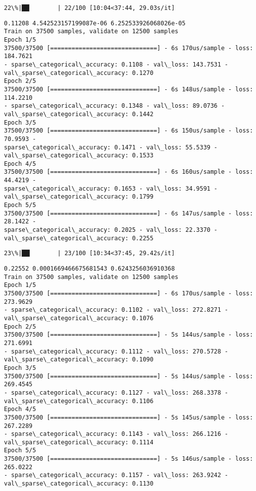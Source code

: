 \documentclass[11pt]{article}
\begin{document}
    \begin{Verbatim}[commandchars=\\\{\}]
 22\%|██▏       | 22/100 [10:04<37:44, 29.03s/it]
    \end{Verbatim}

    \begin{Verbatim}[commandchars=\\\{\}]
0.11208 4.542523157199087e-06 6.252533926068026e-05
Train on 37500 samples, validate on 12500 samples
Epoch 1/5
37500/37500 [==============================] - 6s 170us/sample - loss: 184.7621
- sparse\_categorical\_accuracy: 0.1108 - val\_loss: 143.7531 -
val\_sparse\_categorical\_accuracy: 0.1270
Epoch 2/5
37500/37500 [==============================] - 6s 148us/sample - loss: 114.2210
- sparse\_categorical\_accuracy: 0.1348 - val\_loss: 89.0736 -
val\_sparse\_categorical\_accuracy: 0.1442
Epoch 3/5
37500/37500 [==============================] - 6s 150us/sample - loss: 70.9593 -
sparse\_categorical\_accuracy: 0.1471 - val\_loss: 55.5339 -
val\_sparse\_categorical\_accuracy: 0.1533
Epoch 4/5
37500/37500 [==============================] - 6s 160us/sample - loss: 44.4219 -
sparse\_categorical\_accuracy: 0.1653 - val\_loss: 34.9591 -
val\_sparse\_categorical\_accuracy: 0.1799
Epoch 5/5
37500/37500 [==============================] - 6s 147us/sample - loss: 28.1422 -
sparse\_categorical\_accuracy: 0.2025 - val\_loss: 22.3370 -
val\_sparse\_categorical\_accuracy: 0.2255
    \end{Verbatim}

    \begin{Verbatim}[commandchars=\\\{\}]
 23\%|██▎       | 23/100 [10:34<37:45, 29.42s/it]
    \end{Verbatim}

    \begin{Verbatim}[commandchars=\\\{\}]
0.22552 0.0001669466675681543 0.6243256036910368
Train on 37500 samples, validate on 12500 samples
Epoch 1/5
37500/37500 [==============================] - 6s 170us/sample - loss: 273.9629
- sparse\_categorical\_accuracy: 0.1102 - val\_loss: 272.8271 -
val\_sparse\_categorical\_accuracy: 0.1076
Epoch 2/5
37500/37500 [==============================] - 5s 144us/sample - loss: 271.6991
- sparse\_categorical\_accuracy: 0.1112 - val\_loss: 270.5728 -
val\_sparse\_categorical\_accuracy: 0.1090
Epoch 3/5
37500/37500 [==============================] - 5s 144us/sample - loss: 269.4545
- sparse\_categorical\_accuracy: 0.1127 - val\_loss: 268.3378 -
val\_sparse\_categorical\_accuracy: 0.1106
Epoch 4/5
37500/37500 [==============================] - 5s 145us/sample - loss: 267.2289
- sparse\_categorical\_accuracy: 0.1143 - val\_loss: 266.1216 -
val\_sparse\_categorical\_accuracy: 0.1114
Epoch 5/5
37500/37500 [==============================] - 5s 146us/sample - loss: 265.0222
- sparse\_categorical\_accuracy: 0.1157 - val\_loss: 263.9242 -
val\_sparse\_categorical\_accuracy: 0.1130
    \end{Verbatim}
\end{document}
